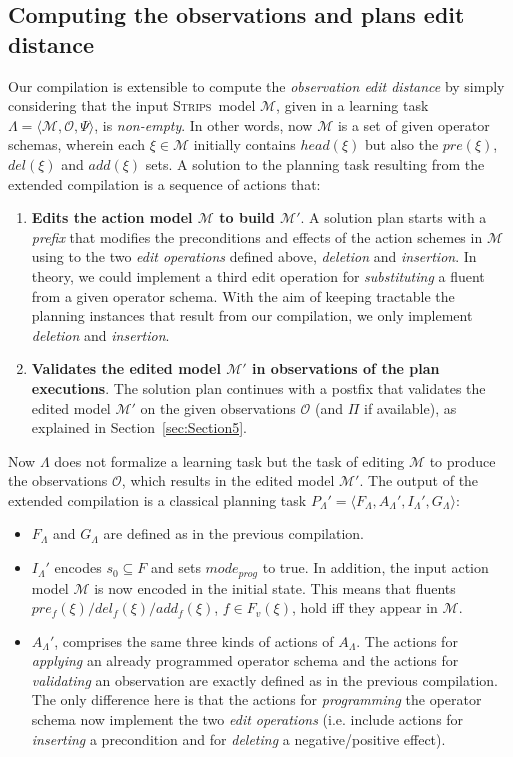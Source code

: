 \documentclass[3p,times]{elsarticle}
\newcommand{\strips}{\textsc{Strips}}     %
\newcommand{\tup}[1]{{\langle #1 \rangle}}
\begin{document}
\subsection{Computing the observations and plans edit distance}
Our compilation is extensible to compute the {\em observation edit distance} by simply considering that the input \strips\ model $\mathcal{M}$, given in a learning task $\Lambda=\tup{\mathcal{M},\mathcal{O},\Psi}$, is {\em non-empty}. In other words, now $\mathcal{M}$ is a set of given operator schemas, wherein each $\xi\in\mathcal{M}$ initially contains $head(\xi)$ but also the $pre(\xi)$, $del(\xi)$ and $add(\xi)$ sets. A solution to the planning task resulting from the extended compilation is a sequence of actions that:

\begin{enumerate}
\item {\bf Edits the action model $\mathcal{M}$ to build $\mathcal{M}'$}. A solution plan starts with a {\em prefix} that modifies the preconditions and effects of the action schemes in $\mathcal{M}$ using to the two {\em edit operations} defined above, {\em deletion} and {\em insertion}. In theory, we could implement a third edit operation for {\em substituting} a fluent from a given operator schema. With the aim of keeping tractable the planning instances that result from our compilation, we only implement {\em deletion} and {\em insertion}.
\item {\bf Validates the edited model $\mathcal{M}'$ in observations of the plan executions}. The solution plan continues with a postfix that validates the edited model $\mathcal{M}'$ on the given observations $\mathcal{O}$ (and $\Pi$ if available), as explained in Section~\ref{sec:Section5}.
\end{enumerate}

Now $\Lambda$ does not formalize a learning task but the task of editing $\mathcal{M}$ to produce the observations $\mathcal{O}$, which results in the edited model $\mathcal{M}'$. The output of the extended compilation is a classical planning task $P_{\Lambda}'=\tup{F_{\Lambda},A_{\Lambda}',I_{\Lambda}',G_{\Lambda}}$:

\begin{itemize}
\item $F_{\Lambda}$ and $G_{\Lambda}$ are defined as in the previous compilation.
\item $I_{\Lambda}'$ encodes $s_0\subseteq F$ and sets $mode_{prog}$ to true. In addition, the input action model $\mathcal{M}$ is now encoded in the initial state. This means that fluents $pre_f(\xi)/del_f(\xi)/add_f(\xi)$, $f\in F_v(\xi)$, hold iff they appear in $\mathcal{M}$.
\item $A_{\Lambda}'$, comprises the same three kinds of actions of $A_{\Lambda}$. The actions for {\em applying} an already programmed operator schema and the actions for {\em validating} an observation are exactly defined as in the previous compilation. The only difference here is that the actions for {\em programming} the operator schema now implement the two {\em edit operations} (i.e. include actions for {\em inserting} a precondition and for {\em deleting} a negative/positive effect).
\end{itemize}
\end{document}
